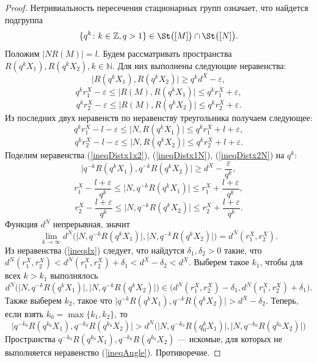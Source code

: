 \begin{proof}
  Нетривиальность пересечения стационарных групп означает, что найдется
  подгруппа \[
    \{q^k \colon k\in \mathbb{Z}, q> 1\} \in \St\big([M]\big) \cap \St
    \big([N]\big).
  \]
  Положим \( |N R(M)| = l \). Будем рассматривать пространства \(
  R(q^k X_1), R(q^k X_2), k \in \mathbb{N} \). Для них выполнены
  следующие неравенства:
  \begin{equation}
    \big| R(q^k X_1), R(q^k X_2) \big| \ge q^k d^X - \varepsilon,
    \label{ineqDistx1x2}
  \end{equation}
  \[
    q^k r_1^X - \varepsilon  \le\big | R(M), R(q^k X_1) \big| \le q^k
    r_1^X + \varepsilon ,
  \]
  \[
    q^k r_2^X - \varepsilon  \le\big | R(M), R(q^k X_2) \big| \le q^k
    r_2^X + \varepsilon .
  \]
  Из последних двух неравенств по неравенству треугольника получаем
  следующее:
  \begin{equation}
    q^k r_1^X - l - \varepsilon \le \big|N, R(q^k X_1) \big| \le
    q^k r_1^X + l + \varepsilon,\label{ineqDistx1N}
  \end{equation}
  \begin{equation}
    q^k r_2^X - l - \varepsilon \le \big|N, R(q^k X_2) \big| \le q^k
    r_2^X + l + \varepsilon.\label{ineqDistx2N}
  \end{equation}
  Поделим неравенства (\ref{ineqDistx1x2}), (\ref{ineqDistx1N}),
  (\ref{ineqDistx2N}) на \( q^k \):
  \[ \big| q^{-k}R(q^k X_1), q^{-k}R(q^k X_2) \big| \ge d^X -
  \frac{\varepsilon }{q^k}, \]
  \[
    r_1^X - \frac{l + \varepsilon}{q^k} \le \big|N, q^{-k}R(q^k X_1)
    \big| \le
    r_1^X + \frac{l + \varepsilon}{q^k},
  \]
  \[
    r_2^X - \frac{l + \varepsilon}{q^k} \le \big|N, q^{-k}R(q^k X_2)
    \big| \le
    r_2^X + \frac{l + \varepsilon}{q^k}.
  \]
  Функция \( d^N \) непрерывная, значит
  \[
    \lim_{k \rightarrow \infty
    }d^N\Big(\big|N, q^{-k}R(q^k X_1)
      \big|, \big|N, q^{-k}R(q^k X_2)
    \big|\Big) = d^N(r_1^X, r_2^X).
  \]
  Из неравенства (\ref{ineqdx}) следует, что найдутся \( \delta
    _1, \delta _2
  > 0 \) такие, что \( d^N(r_1^X,r_2^X)<d^N(r_1^X, r_2^X)+\delta
  _1 < d^X- \delta _2 < d^X \). Выберем такое \( k_1 \), чтобы
  для всех \( k > k_1 \) выполнялось
  \[
    d^N\Big(\big|N, q^{-k}R(q^k X_1)
      \big|, \big|N, q^{-k}R(q^k X_2)
    \big|\Big) \in \big(d^N(r_1^X, r_2^X)- \delta _1,
  d^N(r_1^X, r_2^X)+ \delta _1\big).  \]
  Также выберем \( k_2 \), такое что \( \big| q^{-k}R(q^k X_1),
  q^{-k}R(q^k X_2) \big| > d^X - \delta _2 \).
  Теперь, если взять \( k_0 = \max\{k_1,k_2\} \), то
  \[ \big| q^{-k_0}R(q^{k_0} X_1), q^{-k_0}R(q^{k_0} X_2) \big|
    > d^N\Big(\big|N, q^{-k_0}R(q^k_0 X_1) \big|, \big|N,
  q^{-k_0}R(q^{k_0} X_2) \big|\Big) \]
  Пространства \( q^{-k_0}R(q^{k_0}X_1), q^{-k_0}R(q^{k_0}X_2)\)
  ---
  искомые, для которых не выполняется неравенство (\ref{ineqAngle}).
  Противоречие.
\end{proof}
